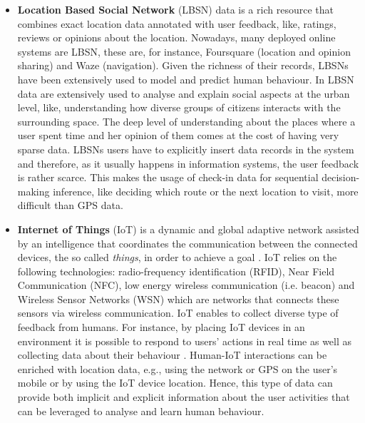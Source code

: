 \begin{itemize}
	
	\item \textbf{Location Based Social Network} (LBSN) data is a rich resource that combines exact location data annotated with user feedback, like, ratings, reviews or opinions about the location. Nowadays, many deployed online systems are LBSN, these are, for instance, Foursquare (location and opinion sharing) and Waze (navigation). Given the richness of their records, LBSNs have been extensively used to model and predict human behaviour. In \cite{lbsn:clusteringUsers,lbsn:gentrification} LBSN data are extensively used to analyse and explain social aspects at the urban level, like, understanding how diverse groups of citizens interacts with the surrounding space.
	The deep level of understanding about the places where a user spent time and her opinion of them comes at the cost of having very sparse data. LBSNs users have to explicitly insert data records in the system and therefore, as it usually happens in information systems, the user feedback is rather scarce. This makes the usage of check-in data for sequential decision-making inference, like deciding which route or the next location to visit, more difficult than GPS data. 
	
	
	\item \textbf{Internet of Things} (IoT) is a dynamic and global adaptive network assisted by an intelligence that coordinates the communication between the connected 
	devices, the so called \emph{things}, in order to achieve a goal \cite{iotdef:li,li:zhao:2015,atzori:morabito:2011}.
	IoT relies on the following technologies: radio-frequency identification (RFID), Near Field Communication (NFC), low energy wireless communication (i.e. beacon) and Wireless 
	Sensor Networks (WSN) which are networks that connects these sensors via wireless communication.
	IoT enables to collect diverse type of feedback from humans. For instance, by placing IoT devices in an environment it is possible to respond to users' actions in real time as well as collecting data about their behaviour \cite{iot:notifications, iot-sensor-healthcare, petrelli2013integrating}. Human-IoT interactions can be enriched with location data, e.g., using the network or GPS on the user's mobile or by using the IoT device location. Hence, this type of data can provide both implicit and explicit information about the user activities that can be leveraged to analyse and learn human behaviour. 
\end{itemize}

